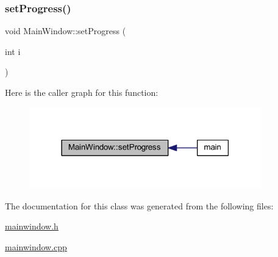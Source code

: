 \subsubsection{\texorpdfstring{set\+Progress()}{setProgress()}}
{\footnotesize\ttfamily void Main\+Window\+::set\+Progress (\begin{DoxyParamCaption}\item[{int}]{i }\end{DoxyParamCaption})}

Here is the caller graph for this function\+:\nopagebreak
\begin{figure}[H]
\begin{center}
\leavevmode
\includegraphics[width=285pt]{class_main_window_ae576381be77310817278e79c978d1135_icgraph}
\end{center}
\end{figure}


The documentation for this class was generated from the following files\+:\begin{DoxyCompactItemize}
\item 
\mbox{\hyperlink{mainwindow_8h}{mainwindow.\+h}}\item 
\mbox{\hyperlink{mainwindow_8cpp}{mainwindow.\+cpp}}\end{DoxyCompactItemize}
